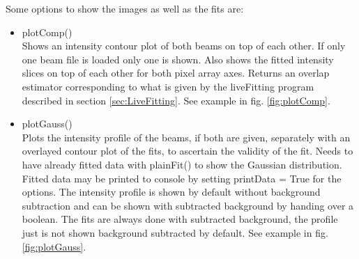 \documentclass[twoside,openright,listof=numbered]{scrreprt}
\begin{document}
Some options to show the images as well as the fits are:
\begin{itemize}
\item plotComp()\\
Shows an intensity contour plot of both beams on top of each other. If only one beam file is loaded only one is shown. Also shows the fitted intensity slices on top of each other for both pixel array axes. Returns an overlap estimator corresponding to what is given by the liveFitting program described in section \ref{sec:LiveFitting}. See example in fig. \ref{fig:plotComp}.
\item plotGauss()\\
Plots the intensity profile of the beams, if both are given, separately with an overlayed contour plot of the fits, to ascertain the validity of the fit. Needs to have already fitted data with plainFit() to show the Gaussian distribution. Fitted data may be printed to console by setting printData = True for the options. The intensity profile is shown by default without background subtraction and can be shown with subtracted background by handing over a boolean. The fits are always done with subtracted background, the profile just is not shown background subtracted by default. See example in fig. \ref{fig:plotGauss}.
\end{itemize}
\end{document}
